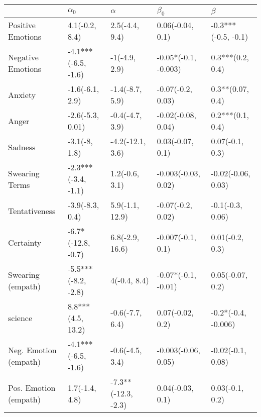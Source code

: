 \begin{tabular}{lllll}
\toprule
{} &           $\alpha_0$ &             $\alpha$ &             $\beta_0$ &              $\beta$ \\
\midrule
Positive Emotions     &       4.1(-0.2, 8.4) &       2.5(-4.4, 9.4) &      0.06(-0.04, 0.1) &  -0.3***(-0.5, -0.1) \\
Negative Emotions     &  -4.1***(-6.5, -1.6) &        -1(-4.9, 2.9) &  -0.05*(-0.1, -0.003) &     0.3***(0.2, 0.4) \\
Anxiety               &      -1.6(-6.1, 2.9) &      -1.4(-8.7, 5.9) &     -0.07(-0.2, 0.03) &     0.3**(0.07, 0.4) \\
Anger                 &     -2.6(-5.3, 0.01) &      -0.4(-4.7, 3.9) &    -0.02(-0.08, 0.04) &     0.2***(0.1, 0.4) \\
Sadness               &        -3.1(-8, 1.8) &     -4.2(-12.1, 3.6) &      0.03(-0.07, 0.1) &      0.07(-0.1, 0.3) \\
Swearing Terms        &  -2.3***(-3.4, -1.1) &       1.2(-0.6, 3.1) &   -0.003(-0.03, 0.02) &   -0.02(-0.06, 0.03) \\
Tentativeness         &      -3.9(-8.3, 0.4) &      5.9(-1.1, 12.9) &     -0.07(-0.2, 0.02) &     -0.1(-0.3, 0.06) \\
Certainty             &   -6.7*(-12.8, -0.7) &      6.8(-2.9, 16.6) &     -0.007(-0.1, 0.1) &      0.01(-0.2, 0.3) \\
Swearing (empath)     &  -5.5***(-8.2, -2.8) &         4(-0.4, 8.4) &   -0.07*(-0.1, -0.01) &     0.05(-0.07, 0.2) \\
science               &    8.8***(4.5, 13.2) &      -0.6(-7.7, 6.4) &      0.07(-0.02, 0.2) &  -0.2*(-0.4, -0.006) \\
Neg. Emotion (empath) &  -4.1***(-6.5, -1.6) &      -0.6(-4.5, 3.4) &   -0.003(-0.06, 0.05) &    -0.02(-0.1, 0.08) \\
Pos. Emotion (empath) &       1.7(-1.4, 4.8) &  -7.3**(-12.3, -2.3) &      0.04(-0.03, 0.1) &      0.03(-0.1, 0.2) \\
\bottomrule
\end{tabular}

